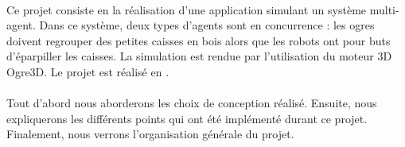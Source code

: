 \paragraph{}Ce projet consiste en la réalisation d'une application simulant un système
multi-agent. Dans ce système, deux types d'agents sont en concurrence : les
ogres doivent regrouper des petites caisses en bois alors que les robots ont
pour buts d'éparpiller les caisses.
La simulation est rendue par l'utilisation du moteur 3D Ogre3D. Le projet est
réalisé en \CS.


\paragraph{}Tout d'abord nous aborderons les choix de conception réalisé.
Ensuite, nous expliquerons les différents points qui ont été implémenté
durant ce projet. Finalement, nous verrons l'organisation générale du projet.

